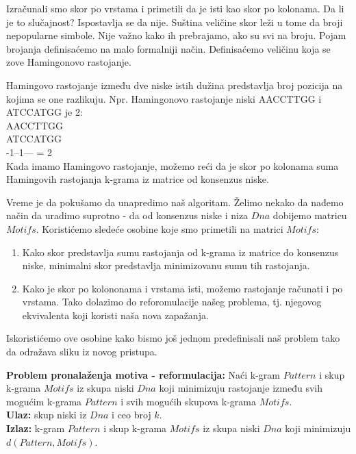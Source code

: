 \newpage

Izračunali smo skor po vrstama i primetili da je isti kao skor po kolonama. Da li je to slučajnost? Ispostavlja se da nije. Suština veličine skor leži u tome da broji nepopularne simbole. Nije važno kako ih prebrajamo, ako su svi na broju. 
Pojam brojanja definisaćemo na malo formalniji način. Definisaćemo veličinu koja se zove Hamingonovo rastojanje.

Hamingovo rastojanje između dve niske istih dužina predstavlja broj pozicija na kojima se one razlikuju. Npr. Hamingonovo rastojanje niski AACCTTGG i ATCCATGG je 2:\\
AACCTTGG\\
ATCCATGG\\
-1--1--- = 2\\

Kada imamo Hamingovo rastojanje, možemo reći da je skor po kolonama suma Hamingovih rastojanja k-grama iz matrice od konsenzus niske. 


Vreme je da pokušamo da unapredimo naš algoritam. Želimo nekako da nađemo način da uradimo suprotno - da od konsenzus niske i niza $Dna$ dobijemo matricu $Motifs$. 
Koristićemo sledeće osobine koje smo primetili na matrici $Motifs$:
\begin{enumerate}
    \item Kako skor predstavlja sumu rastojanja od k-grama iz matrice do konsenzus niske, minimalni skor predstavlja minimizovanu sumu tih rastojanja.
    \item Kako je skor po kolononama i vrstama isti, možemo rastojanje računati i po vrstama. 
    Tako dolazimo do reforomulacije našeg problema, tj. njegovog ekvivalenta koji koristi naša nova zapažanja.
\end{enumerate}

Iskoristićemo ove osobine kako bismo još jednom predefinisali naš problem tako da odražava sliku iz novog pristupa.

\begin{tcolorbox}
\textbf{Problem pronalaženja motiva - reformulacija:} Naći k-gram $Pattern$ i skup k-grama $Motifs$ iz skupa niski $Dna$ koji minimizuju rastojanje između svih mogućim k-grama $Pattern$ i svih mogućih skupova k-grama $Motifs$.\\
\textbf{Ulaz:} skup niski iz $Dna$ i ceo broj $k$.\\
\textbf{Izlaz:} k-gram $Pattern$ i skup k-grama $Motifs$ iz skupa niski $Dna$ koji minimizuju $d(Pattern, Motifs)$.
\end{tcolorbox}

